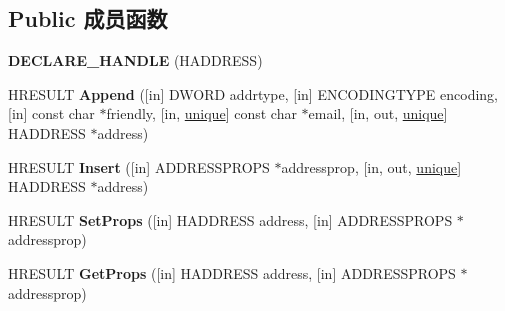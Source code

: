\subsection*{Public 成员函数}
\begin{DoxyCompactItemize}
\item 
\mbox{\label{interface_m_i_m_e_o_l_e_1_1_i_mime_address_table_a0470465752b6b6b2e0e9515aa97b2e71}} 
{\bfseries D\+E\+C\+L\+A\+R\+E\+\_\+\+H\+A\+N\+D\+LE} (H\+A\+D\+D\+R\+E\+SS)
\item 
\mbox{\label{interface_m_i_m_e_o_l_e_1_1_i_mime_address_table_a4475749269aebc49edea44ec83f3f291}} 
H\+R\+E\+S\+U\+LT {\bfseries Append} (\mbox{[}in\mbox{]} D\+W\+O\+RD addrtype, \mbox{[}in\mbox{]} E\+N\+C\+O\+D\+I\+N\+G\+T\+Y\+PE encoding, \mbox{[}in\mbox{]} const char $\ast$friendly, \mbox{[}in, \hyperlink{interfaceunique}{unique}\mbox{]} const char $\ast$email, \mbox{[}in, out, \hyperlink{interfaceunique}{unique}\mbox{]} H\+A\+D\+D\+R\+E\+SS $\ast$address)
\item 
\mbox{\label{interface_m_i_m_e_o_l_e_1_1_i_mime_address_table_a3fc578a29449976356dae7718be23d21}} 
H\+R\+E\+S\+U\+LT {\bfseries Insert} (\mbox{[}in\mbox{]} A\+D\+D\+R\+E\+S\+S\+P\+R\+O\+PS $\ast$addressprop, \mbox{[}in, out, \hyperlink{interfaceunique}{unique}\mbox{]} H\+A\+D\+D\+R\+E\+SS $\ast$address)
\item 
\mbox{\label{interface_m_i_m_e_o_l_e_1_1_i_mime_address_table_ad1be123fcc308ad38835e21c5c5062ca}} 
H\+R\+E\+S\+U\+LT {\bfseries Set\+Props} (\mbox{[}in\mbox{]} H\+A\+D\+D\+R\+E\+SS address, \mbox{[}in\mbox{]} A\+D\+D\+R\+E\+S\+S\+P\+R\+O\+PS $\ast$addressprop)
\item 
\mbox{\label{interface_m_i_m_e_o_l_e_1_1_i_mime_address_table_af894ac6acfdf1000a4d19d782ee1ff43}} 
H\+R\+E\+S\+U\+LT {\bfseries Get\+Props} (\mbox{[}in\mbox{]} H\+A\+D\+D\+R\+E\+SS address, \mbox{[}in\mbox{]} A\+D\+D\+R\+E\+S\+S\+P\+R\+O\+PS $\ast$addressprop)
\item 
\mbox{\label{interface_m_i_m_e_o_l_e_1_1_i_mime_address_table_a593cee6c3a3e348d6fe1c34375d47741}} 

\end{DoxyCompactItemize}
